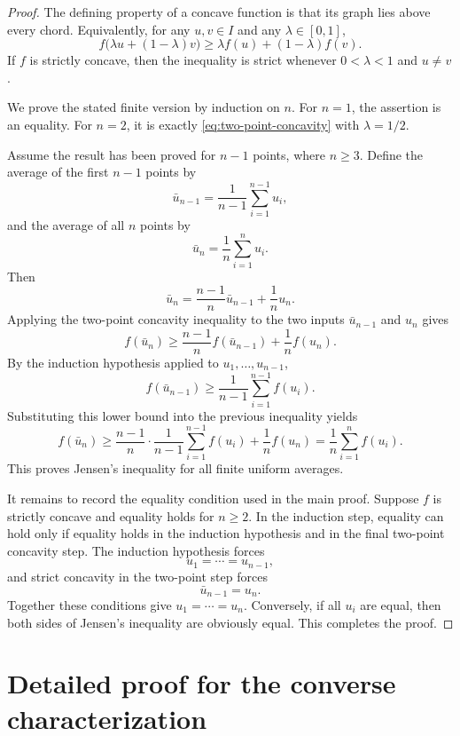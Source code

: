 \documentclass[12pt,a4paper]{article}
\begin{document}
\begin{proof}
The defining property of a concave function is that its graph lies above every chord.  Equivalently, for any $u,v\in I$ and any $\lambda\in[0,1]$,
\begin{equation}
\label{eq:two-point-concavity}
  f\bigl(\lambda u+(1-\lambda)v\bigr)
  \geq
  \lambda f(u)+(1-\lambda)f(v).
\end{equation}
If $f$ is strictly concave, then the inequality is strict whenever $0<\lambda<1$ and $u\neq v$.

We prove the stated finite version by induction on $n$.  For $n=1$, the assertion is an equality.  For $n=2$, it is exactly \eqref{eq:two-point-concavity} with $\lambda=1/2$.

Assume the result has been proved for $n-1$ points, where $n\geq3$.  Define the average of the first $n-1$ points by
\[
  \bar u_{n-1}=\frac{1}{n-1}\sum_{i=1}^{n-1}u_i,
\]
and the average of all $n$ points by
\[
  \bar u_n=\frac{1}{n}\sum_{i=1}^n u_i.
\]
Then
\[
  \bar u_n=\frac{n-1}{n}\bar u_{n-1}+\frac{1}{n}u_n.
\]
Applying the two-point concavity inequality to the two inputs $\bar u_{n-1}$ and $u_n$ gives
\[
  f(\bar u_n)
  \geq
  \frac{n-1}{n}f(\bar u_{n-1})+\frac{1}{n}f(u_n).
\]
By the induction hypothesis applied to $u_1,\ldots,u_{n-1}$,
\[
  f(\bar u_{n-1})
  \geq
  \frac{1}{n-1}\sum_{i=1}^{n-1}f(u_i).
\]
Substituting this lower bound into the previous inequality yields
\[
  f(\bar u_n)
  \geq
  \frac{n-1}{n}\cdot\frac{1}{n-1}\sum_{i=1}^{n-1}f(u_i)
  +\frac{1}{n}f(u_n)
  =
  \frac{1}{n}\sum_{i=1}^n f(u_i).
\]
This proves Jensen's inequality for all finite uniform averages.

It remains to record the equality condition used in the main proof.  Suppose $f$ is strictly concave and equality holds for $n\geq2$.  In the induction step, equality can hold only if equality holds in the induction hypothesis and in the final two-point concavity step.  The induction hypothesis forces
\[
  u_1=\cdots=u_{n-1},
\]
and strict concavity in the two-point step forces
\[
  \bar u_{n-1}=u_n.
\]
Together these conditions give $u_1=\cdots=u_n$.  Conversely, if all $u_i$ are equal, then both sides of Jensen's inequality are obviously equal.  This completes the proof.
\end{proof}


\section{Detailed proof for the converse characterization}
\label{app:converse-details}
\end{document}
